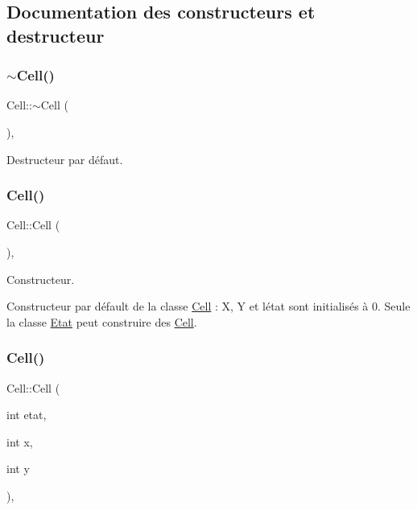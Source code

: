\subsection{Documentation des constructeurs et destructeur}
\mbox{\label{class_cell_a508f988fb5b1ef8358589363c1af3ee4}} 
\subsubsection{\texorpdfstring{$\sim$\+Cell()}{~Cell()}}
{\footnotesize\ttfamily Cell\+::$\sim$\+Cell (\begin{DoxyParamCaption}{ }\end{DoxyParamCaption})\hspace{0.3cm}{\ttfamily [private]}, {\ttfamily [default]}}



Destructeur par défaut. 

\mbox{\label{class_cell_a394510643e8664cf12b5efaf5cb99f71}} 
\subsubsection{\texorpdfstring{Cell()}{Cell()}\hspace{0.1cm}{\footnotesize\ttfamily [1/3]}}
{\footnotesize\ttfamily Cell\+::\+Cell (\begin{DoxyParamCaption}{ }\end{DoxyParamCaption})\hspace{0.3cm}{\ttfamily [inline]}, {\ttfamily [private]}}



Constructeur. 

Constructeur par défault de la classe \mbox{\hyperlink{class_cell}{Cell}} \+: X, Y et l\textquotesingle{}état sont initialisés à 0. Seule la classe \mbox{\hyperlink{class_etat}{Etat}} peut construire des \mbox{\hyperlink{class_cell}{Cell}}. \mbox{\label{class_cell_abfff4b378d15d85506663df528762eaf}} 
\subsubsection{\texorpdfstring{Cell()}{Cell()}\hspace{0.1cm}{\footnotesize\ttfamily [2/3]}}
{\footnotesize\ttfamily Cell\+::\+Cell (\begin{DoxyParamCaption}\item[{int}]{etat,  }\item[{int}]{x,  }\item[{int}]{y }\end{DoxyParamCaption})\hspace{0.3cm}{\ttfamily [inline]}, {\ttfamily [private]}}



